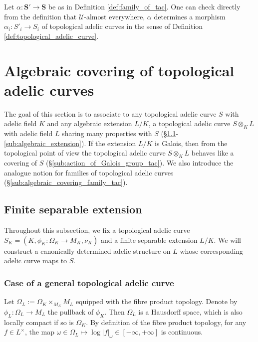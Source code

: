 \documentclass [11pt,reqno]{amsart}
\newcommand{\1}{\mathmybb{1}}
\def\cU{{\mathcal{U}}}
\begin{document}
\begin{remark}
\label{rem:morphism_family_tac}
Let $\alpha : \mathbf{S'} \to \mathbf{S}$ be as in Definition \ref{def:family_of_tac}. One can check directly from the definition that $\cU$-almost everywhere, $\alpha$ determines a morphism $\alpha_{i} : S'_{i}\to S_{i}$ of topological adelic curves in the sense of Definition \ref{def:topological_adelic_curve}.
\end{remark}


\section{Algebraic covering of topological adelic curves}
\label{sec:algebraic_covering_tac}

The goal of this section is to associate to any topological adelic curve $S$ with adelic field $K$ and any algebraic extension $L/K$, a topological adelic curve $S\otimes_{K}L$ with adelic field $L$ sharing many properties with $S$ (\S \ref{sub:finite_separable_extension_tac}-\ref{sub:algebraic_extension}). If the extension $L/K$ is Galois, then from the topological point of view the topological adelic curve $S\otimes_{K}L$ behaves like a covering of $S$ (\S \ref{sub:action_of_Galois_group_tac}). We also introduce the analogue notion for families of topological adelic curves (\S \ref{sub:algebraic_covering_family_tac}).

\subsection{Finite separable extension}
\label{sub:finite_separable_extension_tac}

Throughout this subsection, we fix a topological adelic curve $S_{K}=(K,\phi_K : \Omega_K \to M_K,\nu_K)$ and a finite separable extension $L/K$. We will construct a canonically determined adelic structure on $L$ whose corresponding adelic curve maps to $S$. 


\subsubsection{Case of a general topological adelic curve}

Let $\Omega_L := \Omega_K \times_{M_{K}} M_{L}$ equipped with the fibre product topology. Denote by $\phi_L: \Omega_L \to M_L$ the pullback of $\phi_K$. Then $\Omega_L$ is a Hausdorff space, which is also locally compact if so is $\Omega_{K}$. By definition of the fibre product topology, for any $f\in L^{\times}$, the map $\omega\in \Omega_L \mapsto \log|f|_{\omega} \in [-\infty,+\infty]$ is continuous. 
\end{document}
